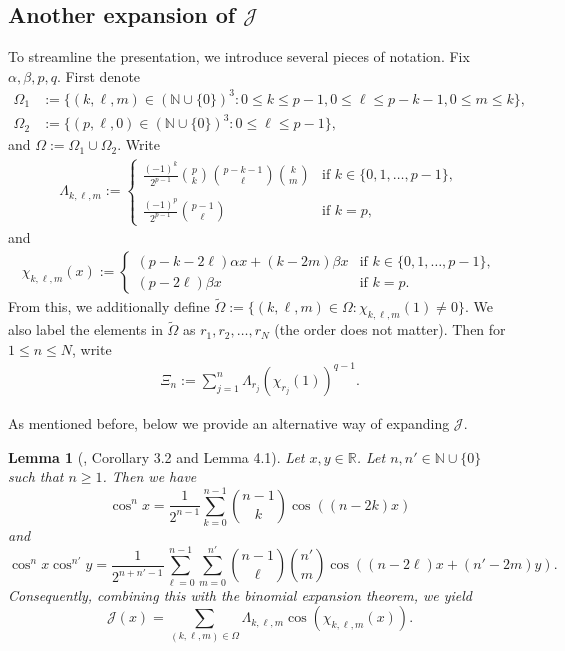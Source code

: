 \documentclass[12pt, reqno]{amsart}
\theoremstyle{plain}
\newtheorem{lemma}[theorem]{Lemma}
\theoremstyle{definition}
\begin{document}
\subsection{Another expansion of $\mathcal{J}$}\label{sec4.1}

To streamline the presentation, we introduce several pieces of notation. Fix $\alpha, \beta, p, q$. First denote
\begin{align*}
    \Omega_1&:=\{(k, \ell, m)\in(\mathbb{N}\cup\{0\})^3 : 0\le k\le p-1, 0\le \ell\le p-k-1, 0\le m\le k\},\\
    \Omega_2&:=\{(p, \ell, 0)\in(\mathbb{N}\cup\{0\})^3 : 0\le \ell\le p-1\},
\end{align*}
and $\Omega:=\Omega_1\cup\Omega_2$. Write
\begin{align*}
    \Lambda_{k, \ell, m}:=\begin{cases}
        \displaystyle\frac{(-1)^k}{2^{p-1}}\binom{p}{k}\binom{p-k-1} {\ell}\binom{k}{m}  &\text{if } k\in\{0, 1, \ldots, p-1\},\\\\
        \displaystyle\frac{(-1)^p}{2^{p-1}}\binom{p-1}{\ell} &\text{if }k=p,
    \end{cases}
\end{align*}
and
\begin{align*}
    \chi_{k, \ell, m}(x):=\begin{cases}
        (p-k-2\ell)\alpha x+(k-2m)\beta x &\text{if } k\in\{0, 1, \ldots, p-1\},\\
        (p-2\ell)\beta x &\text{if } k=p.
    \end{cases}
\end{align*}
From this, we additionally define  $\tilde{\Omega}:=\{(k, \ell, m)\in\Omega : \chi_{k, \ell, m}(1)\ne 0\}$. We also label the elements in $\tilde{\Omega}$ as $r_1, r_2, \ldots, r_N$ (the order does not matter).  Then for $1\le n\le N$, write
\begin{align*}
    \Xi_n:=\sum_{j=1}^n\Lambda_{r_j}(\chi_{r_j}(1))^{q-1}.
\end{align*}

As mentioned before, below we provide an alternative way of expanding $\mathcal{J}$.


\begin{lemma}[\cite{AL}, Corollary 3.2 and Lemma 4.1]\label{long}
    Let $x, y\in\mathbb{R}$. Let $n, n'\in\mathbb{N}\cup\{0\}$ such that $n\ge 1$. Then we have
     \[\cos^nx=\frac{1}{2^{n-1}}\sum_{k=0}^{n-1}\binom{n-1}{k}\cos((n-2k)x)\]
     and
    \[\cos^nx\cos^{n'}y=\frac{1}{2^{n+n'-1}}\sum_{\ell=0}^{n-1}\sum_{m=0}^{n'}\binom{n-1}{\ell}\binom{n'}{m}\cos((n-2\ell)x+(n'-2m)y).\]
    Consequently, combining this with the binomial expansion theorem, we yield
    \[\mathcal{J}(x)=\sum_{(k, \ell, m)\in\Omega}\Lambda_{k, \ell, m}\cos(\chi_{k, \ell, m}(x)).\]
\end{lemma}
\end{document}
